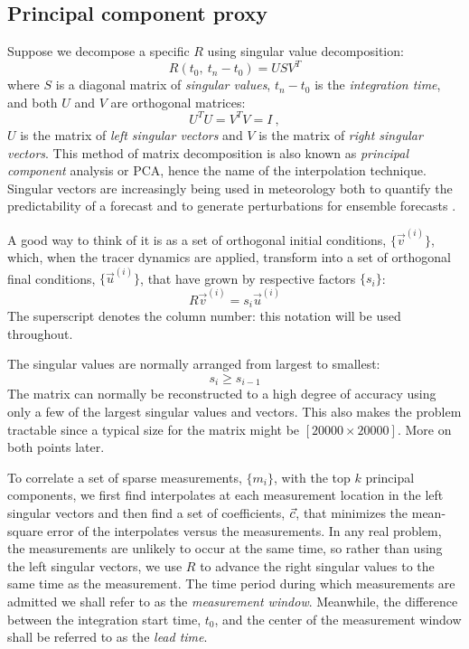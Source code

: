 \documentclass{article}
\begin{document}
\subsection{Principal component proxy}

Suppose we decompose a specific $R$ using singular value decomposition:
\begin{equation}
	R(t_0, ~ t_n - t_0) = U S V^T
	\label{SVD}
\end{equation}
where $S$ is a diagonal matrix of {\it singular values},
$t_n - t_0$ is the {\it integration time},
and both $U$ and $V$ are orthogonal matrices:
\begin{equation}
	U^T U = V^T V = I~,
\end{equation}
$U$ is the matrix of {\it left singular vectors} and 
$V$ is the matrix of {\it right singular vectors}.
This method of matrix decomposition is also known as {\it principal component}
analysis or PCA, hence the name of the interpolation technique.
Singular vectors are increasingly being used in meteorology both to quantify the
predictability of a forecast and to generate perturbations for ensemble
forecasts \citep{Tang_etal2006}.

A good way to think of it is as a set of orthogonal initial conditions,
$\lbrace \vec v^{(i)} \rbrace$, which, when the tracer dynamics are applied,
transform into a set of orthogonal final conditions, 
$\lbrace \vec u^{(i)} \rbrace$,
that have grown by respective factors $\lbrace s_i \rbrace$:
\begin{equation}
	R \vec v^{(i)} = s_i \vec u^{(i)}
\end{equation}
The superscript denotes the column number: 
this notation will be used throughout.

The singular values are normally arranged from largest to smallest:
\begin{equation}
	s_i \ge s_{i-1}
\end{equation}
The matrix can normally be reconstructed to a high degree of accuracy
using only a few of the largest singular values and vectors.
This also makes the problem tractable since a typical size for
the matrix might be $[20000\times20000]$. More on both points later.

To correlate a set of sparse measurements, $\lbrace m_i \rbrace$,
with the top $k$ principal components, we first find interpolates at each
measurement location in the left singular vectors and then find a set
of coefficients, $\vec c$, that minimizes the mean-square error of the
interpolates versus the measurements.
In any real problem, the measurements are unlikely to occur at the same time,
so rather than using the left singular vectors, we use $R$ to advance the
right singular values to the same time as the measurement.
The time period during which measurements are admitted we shall refer to as
the {\it measurement window}.
Meanwhile, the difference between the integration start time, $t_0$,
and the center of the measurement window shall be referred to as the
{\it lead time}.
\end{document}
